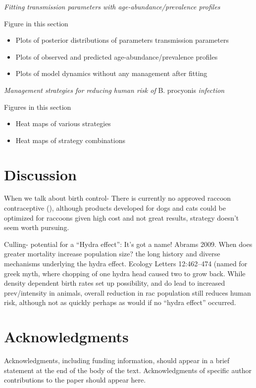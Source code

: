 \documentclass[11pt]{article}
\begin{document}
\emph{Fitting transmission parameters with age-abundance/prevalence
profiles}

Figure in this section

\begin{itemize}
\item
  Plots of posterior distributions of parameters transmission parameters
\item
  Plots of observed and predicted age-abundance/prevalence profiles
\item
  Plots of model dynamics without any management after fitting
\end{itemize}

\emph{Management strategies for reducing} \emph{human risk of} B.
procyonis \emph{infection}

Figures in this section

\begin{itemize}
\item
  Heat maps of various strategies
\item
  Heat maps of strategy combinations
\end{itemize}

\section{Discussion}

When we talk about birth control- There is currently no approved raccoon
contraceptive (), although products developed for dogs and cats could be
optimized for raccoons given high cost and not great results, strategy
doesn't seem worth pursuing.

Culling- potential for a ``Hydra effect'': It's got a name! Abrams 2009.
When does greater mortality increase population size? the long history
and diverse mechanisms underlying the hydra effect. Ecology Letters
12:462--474 (named for greek myth, where chopping of one hydra head
caused two to grow back. While density dependent birth rates set up
possibility, and do lead to increased prev/intensity in animals, overall
reduction in rac population still reduces human risk, although not as
quickly perhaps as would if no ``hydra effect'' occurred.

\section{Acknowledgments} 

Acknowledgments, including funding
information, should appear in a brief statement at the end of the body
of the text. Acknowledgments of specific author contributions to the
paper should appear here.
\end{document}
